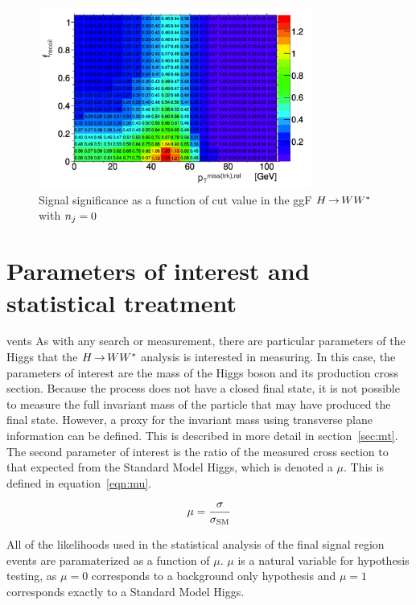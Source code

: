 \begin{figure}[h!]
  \centering
  \captionsetup{justification=centering}

  \includegraphics[width=0.8\textwidth]{figures/SFoptimization}
  \caption{Signal significance as a function of cut value in the ggF $H{\,{\rightarrow}\,}WW^\ast$ with $n_j = 0$}
  \label{fig:optimization}
\end{figure}


\section{Parameters of interest and statistical treatment}
vents 
As with any search or measurement, there are particular parameters of the Higgs that the $H{\,{\rightarrow}\,}WW^\ast$ analysis is interested in measuring. In this case, the parameters of interest are the mass of the Higgs boson and its production cross section. Because the \HWWfull process does not have a closed final state, it is not possible to measure the full invariant mass of the particle that may have produced the final state. However, a proxy for the invariant mass using transverse plane information can be defined. This is described in more detail in section~\ref{sec:mt}. The second parameter of interest is the ratio of the measured cross section to that expected from the Standard Model Higgs, which is denoted a $\mu$. This is defined in equation~\ref{eqn:mu}.

\begin{equation}
\mu = \frac{\sigma}{\sigma_{\rm SM}}
\label{eqn:mu}
\end{equation}

All of the likelihoods used in the statistical analysis of the final signal region events are paramaterized as a function of $\mu$. $\mu$ is a natural variable for hypothesis testing, as $\mu = 0$ corresponds to a background only hypothesis and $\mu = 1$ corresponds exactly to a Standard Model Higgs. 

